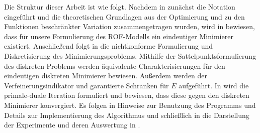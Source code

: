 Die Struktur dieser Arbeit ist wie folgt.
Nachdem in  zunächst die Notation eingeführt und
die theoretischen Grundlagen aus der Optimierung und zu den Funktionen
beschränkter Variation zusammengetragen wurden, wird in
 bewiesen, dass für unsere Formulierung des
ROF-Modells ein eindeutiger Minimierer existiert.
Anschließend folgt in  die nichtkonforme
Formulierung und Diskretisierung des Minimierungsproblems. 
Mithilfe der Sattelpunktsformulierung des diskreten Problems werden äquivalente
Charakterisierungen für den eindeutigen diskreten Minimierer bewiesen. 
Außerdem werden der Verfeinerungsindikator und garantierte Schranken für $E$
aufgeführt.
In  wird die primale-duale Iteration formuliert und
bewiesen, dass diese gegen den diskreten Minimierer konvergiert. 
Es folgen in  Hinweise zur Benutzung des Programms
und Details zur Implementierung des Algorithmus und schließlich in
 die Darstellung der Experimente und deren Auswertung in
 .

